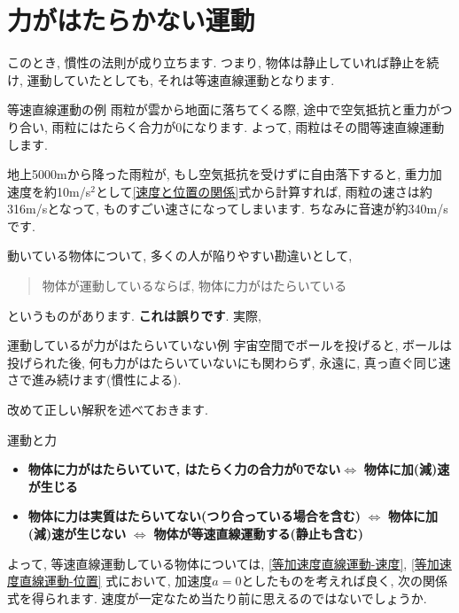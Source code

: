\documentclass[11pt,dvipdfmx]{jsarticle}
\numberwithin{equation}{section} %
\begin{document}
\section{力がはたらかない運動}\label{力がはたらかない運動}
このとき, 慣性の法則が成り立ちます. つまり, 物体は静止していれば静止を続け, 運動していたとしても, それは等速直線運動となります. 
\begin{exbox}{等速直線運動の例}
雨粒が雲から地面に落ちてくる際, 途中で空気抵抗と重力がつり合い, 雨粒にはたらく合力が0になります. よって, 雨粒はその間等速直線運動します. 

地上5000mから降った雨粒が, もし空気抵抗を受けずに自由落下すると, 重力加速度を約10m/s$^2$として\eqref{速度と位置の関係}式から計算すれば, 雨粒の速さは約316m/sとなって, ものすごい速さになってしまいます. ちなみに音速が約340m/sです.
\end{exbox}
動いている物体について, 多くの人が陥りやすい勘違いとして, 
\begin{quotation}
    物体が運動しているならば, 物体に力がはたらいている
\end{quotation}
というものがあります. \textbf{これは誤りです}. 
実際, 
\begin{exbox}{運動しているが力がはたらいていない例}
    宇宙空間でボールを投げると, ボールは投げられた後, 何も力がはたらいていないにも関わらず, 永遠に, 真っ直ぐ同じ速さで進み続けます(慣性による). 
\end{exbox}
改めて正しい解釈を述べておきます. 
\begin{freebox}{運動と力}
    \begin{itemize}
        \item \textbf{物体に力がはたらいていて, はたらく力の合力が0でない}$\Longleftrightarrow$ \textbf{物体に加(減)速が生じる}
        \item \textbf{物体に力は実質はたらいてない(つり合っている場合を含む)}
        $\Longleftrightarrow$
        \textbf{物体に加(減)速が生じない}
        $\Longleftrightarrow$ \textbf{物体が等速直線運動する(静止も含む)}
    \end{itemize}
\end{freebox}
よって, 等速直線運動している物体については, \eqref{等加速度直線運動-速度}, \eqref{等加速度直線運動-位置} 式において, 加速度$a=0$としたものを考えれば良く, 次の関係式を得られます. 速度が一定なため当たり前に思えるのではないでしょうか. 
 
\end{document}
